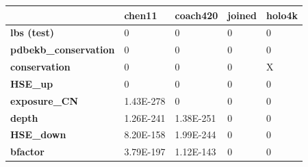 \begin{table}[]
\centering
\begin{tabular}{@{}lllll@{}}
\toprule
{\color[HTML]{000000} }       & {\color[HTML]{000000} \textbf{chen11}} & {\color[HTML]{000000} \textbf{coach420}} & {\color[HTML]{000000} \textbf{joined}} & {\color[HTML]{000000} \textbf{holo4k}} \\ \midrule
\textbf{lbs (test)}                  & 0                                      & 0                                        & 0                                      & 0                                      \\
\textbf{pdbekb\_conservation} & 0                                      & 0                                        & 0                                      & 0                                      \\
\textbf{conservation}         & 0                                      & 0                                        & 0                                      & X                                      \\
\textbf{HSE\_up}              & 0                                      & 0                                        & 0                                      & 0                                      \\
\textbf{exposure\_CN}         & 1.43E-278                              & 0                                        & 0                                      & 0                                      \\
\textbf{depth}                & 1.26E-241                              & 1.38E-251                                & 0                                      & 0                                      \\
\textbf{HSE\_down}            & 8.20E-158                              & 1.99E-244                                & 0                                      & 0                                      \\
\textbf{bfactor}              & 3.79E-197                              & 1.12E-143                                & 0                                      & 0                                      \\

\end{tabular}
\end{table}
